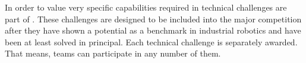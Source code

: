
In order to value very specific capabilities required in \RCAW technical challenges are part of \RCAW.
These challenges are designed to be included into the major competition after they have shown a potential as a benchmark in industrial robotics and have been at least solved in principal.
Each technical challenge is separately awarded. That means, teams can participate in any number of them.





